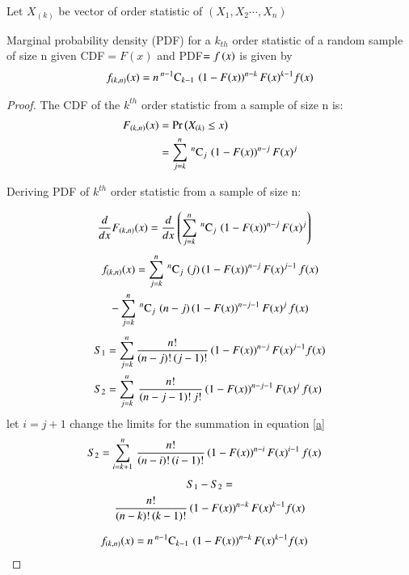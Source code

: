 \documentclass[journal,12pt,twocolumn]{IEEEtran}
\begin{document}
\bigskip

Let $X_{(k)}$ be vector of order statistic of $(X_1,X_2\cdots,X_n)$ 
 \begin{lemma}
 Marginal probability density (PDF) for a $k_{th}$ order statistic of a random sample of size n given CDF$=F(x)$ and
 PDF$=f\left(x\right)$ is given by 
 \begin{align}
f_{(k,n)}(x) = n\,{}^{n-1}\mathrm{C}_{k-1}\,\left(1-F(x)\right)^{n-k}F(x)^{k-1} f(x)
 \end{align}                                                \label{1}
 \end{lemma}
 
\begin{proof}
 The CDF of the $k^{th}$ order statistic from a sample of size n is:
\begin{align}
F_{(k,n)}(x) &= \Pr\left(X_{(k)}\leq x\right) \\
                       &= \displaystyle\sum_{j=k}^{n}\,{}^{n}\mathrm{C}_{j}\,\left(1-F(x)\right)^{n-j} F(x)^{j}
\end{align}
 
Deriving PDF of $k^{th}$ order statistic from a sample of size n:
 
 \begin{align}
\dfrac{d}{dx} F_{(k,n)}(x) &= \dfrac{d}{dx}\left(\displaystyle\sum_{j=k}^{n}\,{}^{n}\mathrm{C}_{j}\,\left(1-F(x)\right)^{n-j} F(x)^{j}\right) 
 \end{align}
\begin{multline}
f_{(k,n)}(x) = \displaystyle\sum_{j=k}^{n}\,{}^{n}\mathrm{C}_{j}\,\left(j\right)\left(1-F(x)\right)^{n-j}F(x)^{j-1}\,f(x)  \\
                -\displaystyle\sum_{j=k}^{n}\,{}^{n}\mathrm{C}_{j}\,\left(n-j\right)\left(1-F(x)\right)^{n-j-1}F(x)^{j}\,f(x) 
\end{multline}
\begin{align}
S_1  &= \displaystyle\sum_{j=k}^{n} \dfrac{n!}{(n-j)!\,(j-1)!}\left(1-F(x)\right)^{n-j}F(x)^{j-1} f(x) \\
S_2  &= \displaystyle\sum_{j=k}^{n}\,\dfrac{n!}{(n-j-1)!\,j!}\left(1-F(x)\right)^{n-j-1}F(x)^{j}\,f(x) \label{a}
\end{align}
let $i = j+1$ change the limits for the summation in equation \eqref{a}
\begin{align}
S_2  &= \displaystyle\sum_{i=k+1}^{n}\,\dfrac{n!}{(n-i)!\,(i-1)!}\left(1-F(x)\right)^{n-i}F(x)^{i-1}\,f(x)  
\end{align}
\begin{multline}
S_1 - S_2  =  \\
           \dfrac{n!}{(n-k)!\,(k-1)!}\left(1-F(x)\right)^{n-k}F(x)^{k-1} f(x) 
\end{multline}

\begin{align}
f_{(k,n)}(x) &= n\,{}^{n-1}\mathrm{C}_{k-1}\,\left(1-F(x)\right)^{n-k}F(x)^{k-1} f(x) \label{b}
\end{align}
\end{proof}
\end{document}
